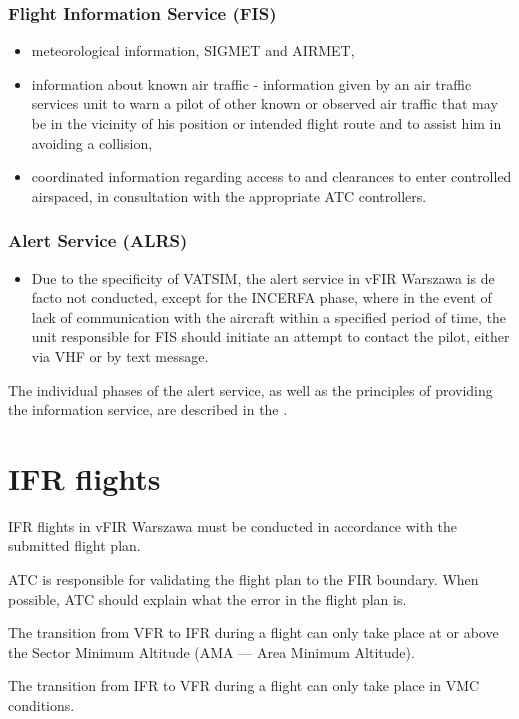\subsubsection{Flight Information Service (FIS)}
\begin{itemize}
	\item meteorological information, SIGMET and AIRMET,
	\item information about known air traffic - information given by an air traffic services unit to warn a pilot of other known or observed air traffic that may be in the vicinity of his position or intended flight route and to assist him in avoiding a collision,
	\item coordinated information regarding access to and clearances to enter controlled airspaced, in consultation with the appropriate ATC controllers.
\end{itemize}

\subsubsection{Alert Service (ALRS)}
\begin{itemize}
	\item Due to the specificity of VATSIM, the alert service in vFIR Warszawa is de facto not conducted, except for the INCERFA phase, where in the event of lack of communication with the aircraft within a specified period of time, the unit responsible for FIS should initiate an attempt to contact the pilot, either via VHF or by text message.
\end{itemize}

The individual phases of the alert service, as well as the principles of providing the information service, are described in the .

\section{IFR flights}%

IFR flights in vFIR Warszawa must be conducted in accordance with the submitted flight plan.

ATC is responsible for validating the flight plan to the FIR boundary. When possible, ATC should explain what the error in the flight plan is.

The transition from VFR to IFR during a flight can only take place at or above the Sector Minimum Altitude (AMA --- Area Minimum Altitude).

The transition from IFR to VFR during a flight can only take place in VMC conditions.

